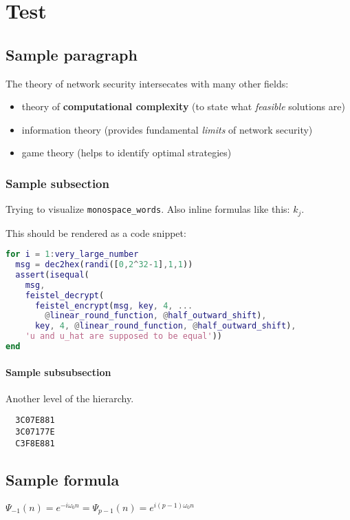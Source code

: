 \chapter{Test}
\section{Sample paragraph}
The theory of network security intersecates with many other fields:

\begin{itemize}
  \item theory of \textbf{computational complexity} (to state what
  \textit{feasible} solutions are)
  \item information theory (provides fundamental \textit{limits} of network
  security)
  \item game theory (helps to identify optimal strategies)
\end{itemize}

\subsection{Sample subsection}
Trying to visualize \texttt{monospace\_words}. Also inline formulas like this:
$k_j$.

This should be rendered as a code snippet:
\begin{lstlisting}[language=Matlab]
for i = 1:very_large_number
  msg = dec2hex(randi([0,2^32-1],1,1))
  assert(isequal(
    msg,
    feistel_decrypt(
      feistel_encrypt(msg, key, 4, ...
        @linear_round_function, @half_outward_shift), 
      key, 4, @linear_round_function, @half_outward_shift),
    'u and u_hat are supposed to be equal'))
end
\end{lstlisting}

\subsubsection{Sample subsubsection}
Another level of the hierarchy.
\begin{verbatim}
  3C07E881
  3C07177E
  C3F8E881
\end{verbatim}

\section{Sample formula}
$\Psi_{-1}(n) = e^{-i\omega_0n} = \Psi_{p-1}(n) = e^{i(p-1)\omega_0n }$

